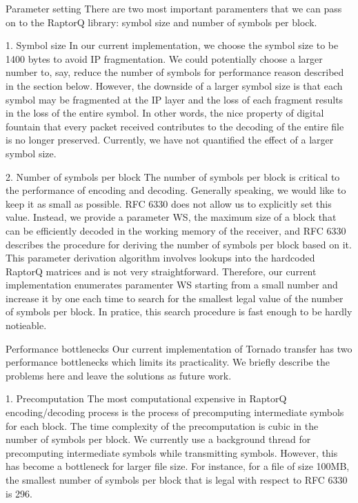 \documentclass{sig-alternate-10pt}
\begin{document}
Parameter setting
There are two most important paramenters that we can pass on to the RaptorQ library: symbol size and number of symbols per block.

1. Symbol size
In our current implementation, we choose the symbol size to be 1400 bytes to avoid IP fragmentation. We could potentially choose a larger number to, say, reduce the number of symbols for performance reason described in the section below. However, the downside of a larger symbol size is that each symbol may be fragmented at the IP layer and the loss of each fragment results in the loss of the entire symbol. In other words, the nice property of digital fountain that every packet received contributes to the decoding of the entire file is no longer preserved. Currently, we have not quantified the effect of a larger symbol size.

2. Number of symbols per block
The number of symbols per block is critical to the performance of encoding and decoding. Generally speaking, we would like to keep it as small as possible. RFC 6330 does not allow us to explicitly set this value. Instead, we provide a parameter WS, the maximum size of a block that can be efficiently decoded in the working memory of the receiver, and RFC 6330 describes the procedure for deriving the number of symbols per block based on it. This parameter derivation algorithm involves lookups into the hardcoded RaptorQ matrices and is not very straightforward. Therefore, our current implementation enumerates paramenter WS starting from a small number and increase it by one each time to search for the smallest legal value of the number of symbols per block. In pratice, this search procedure is fast enough to be hardly notieable.

Performance bottlenecks
Our current implementation of Tornado transfer has two performance bottlenecks which limits its practicality. We briefly describe the problems here and leave the solutions as future work.

1. Precomputation
The most computational expensive in RaptorQ encoding/decoding process is the process of precomputing intermediate symbols for each block. The time complexity of the precomputation is cubic in the number of symbols per block. We currently use a background thread for precomputing intermediate symbols while transmitting symbols. However, this has become a bottleneck for larger file size. For instance, for a file of size 100MB, the smallest number of symbols per block that is legal with respect to RFC 6330 is 296.
\end{document}
